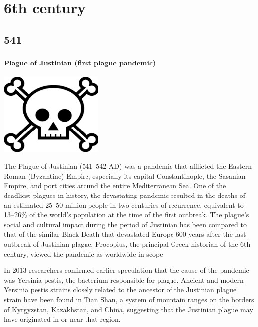 \documentclass[11pt]{report}
\begin{document}
										
	
\part{6th century}

\chapter{541}
\section{}
\subsection{Plague of Justinian (first plague pandemic)}
\vspace{2mm}\begin{center}\includegraphics[width=5cm]{./img/skull.png}\end{center}
The Plague of Justinian (541–542 AD) was a pandemic that afflicted the Eastern Roman (Byzantine) Empire, especially its capital Constantinople, the Sasanian Empire, and port cities around the entire Mediterranean Sea. One of the deadliest plagues in history, the devastating pandemic resulted in the deaths of an estimated 25–50 million people in two centuries of recurrence, equivalent to 13–26\% of the world's population at the time of the first outbreak. The plague's social and cultural impact during the period of Justinian has been compared to that of the similar Black Death that devastated Europe 600 years after the last outbreak of Justinian plague. Procopius, the principal Greek historian of the 6th century, viewed the pandemic as worldwide in scope

In 2013 researchers confirmed earlier speculation that the cause of the pandemic was Yersinia pestis, the bacterium responsible for plague. Ancient and modern Yersinia pestis strains closely related to the ancestor of the Justinian plague strain have been found in Tian Shan, a system of mountain ranges on the borders of Kyrgyzstan, Kazakhstan, and China, suggesting that the Justinian plague may have originated in or near that region.
\end{document}
